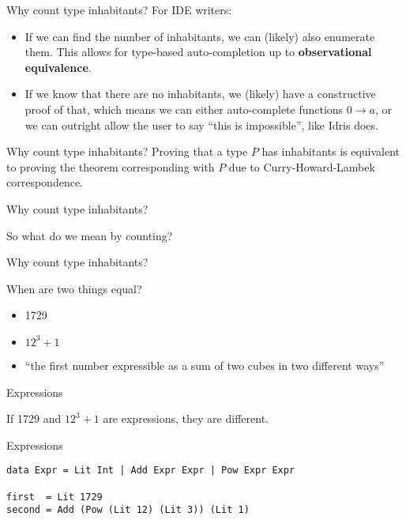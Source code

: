 \documentclass[tikz]{beamer}
\theoremstyle{definition}
\begin{document}
\begin{frame}{Why count type inhabitants?}
For IDE writers:
\begin{itemize}
    \item If we can find the number of inhabitants, we can (likely) also enumerate them. This allows for type-based auto-completion up to \textbf{observational equivalence}.
    \item If we know that there are no inhabitants, we (likely) have a constructive proof of that, which means we can either auto-complete functions $0 \rightarrow a$, or we can outright allow the user to say ``this is impossible'', like Idris does.
\end{itemize}

\end{frame}

\begin{frame}{Why count type inhabitants?}
Proving that a type $P$ has inhabitants is equivalent to proving the theorem corresponding with $P$ due to Curry-Howard-Lambek correspondence.
\end{frame}

\begin{frame}{Why count type inhabitants?}

So what do we mean by counting?

\end{frame}

\begin{frame}{Why count type inhabitants?}

When are two things equal?

\begin{itemize}
	\item 1729
	\item $12^3 + 1$
	\item ``the first number expressible as a sum of two cubes in two different ways''
\end{itemize}

\end{frame}

\begin{frame}[fragile]{Expressions}

If 1729 and $12^3+1$ are expressions, they are different.

\end{frame}

\begin{frame}[fragile]{Expressions}

\begin{verbatim}
data Expr = Lit Int | Add Expr Expr | Pow Expr Expr

first  = Lit 1729
second = Add (Pow (Lit 12) (Lit 3)) (Lit 1)
\end{verbatim}
\end{frame}
\end{document}
